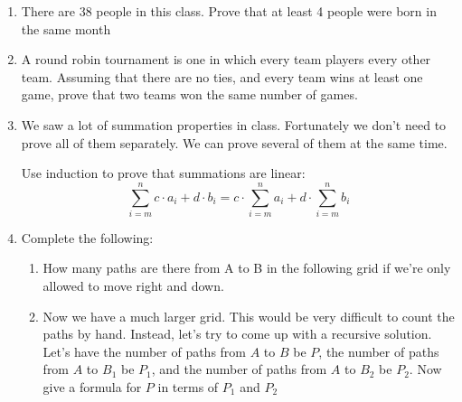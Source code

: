 \documentclass[basic, header]{nosvagor-notes}
\begin{document}
\begin{enumerate}
  \newpage %

  \item There are 38 people in this class. Prove that at least 4 people were
    born in the same month

  \item A round robin tournament is one in which every team players every
    other team. Assuming that there are no ties, and every team wins at least
    one game, prove that two teams won the same number of games.

  \item We saw a lot of summation properties in class. Fortunately we don’t
    need to prove all of them separately. We can prove several of them at the
    same time.

    Use induction to prove that summations are linear:
    \[%
      \sum_{i=m}^n c\cdot a_i + d\cdot b_i = c\cdot \sum_{i=m}^n a_i + d \cdot \sum_{i=m}^n b_i
    \]%

  \newpage %

  \item Complete the following:
    \begin{enumerate}

      \item How many paths are there from A to B in the following grid if we’re
        only allowed to move right and down.

        \begin{center}
        \end{center}

      \item Now we have a much larger grid. This would be very difficult to
        count the paths by hand. Instead, let's try to come up with a recursive
        solution. Let's have the number of paths from $A$ to $B$ be $P$, the
        number of paths from $A$ to $B_1$ be $P_1$, and the number of paths
        from $A$ to $B_2$ be $P_2$. Now give a formula for $P$ in terms of
        $P_1$ and $P_2$


\end{enumerate}
\end{enumerate}
\end{document}
